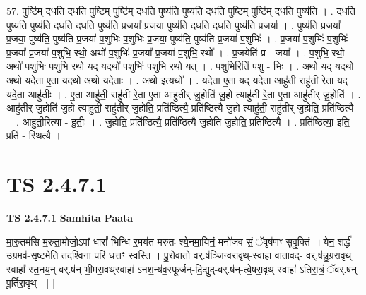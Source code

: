 \documentclass[17pt]{extarticle}
\begin{document}
57. पुष्टि॑म् दधति दधति॒ पुष्टि॒म् पुष्टि॑म् दधति॒ पुष्य॑ति॒ पुष्य॑ति दधति॒ पुष्टि॒म् पुष्टि॑म् दधति॒ पुष्य॑ति । . द॒ध॒ति॒ पुष्य॑ति॒ पुष्य॑ति दधति दधति॒ पुष्य॑ति प्र॒जया᳚ प्र॒जया॒ पुष्य॑ति दधति दधति॒ पुष्य॑ति प्र॒जया᳚ । . पुष्य॑ति प्र॒जया᳚ प्र॒जया॒ पुष्य॑ति॒ पुष्य॑ति प्र॒जया॑ प॒शुभिः॑ प॒शुभिः॑ प्र॒जया॒ पुष्य॑ति॒ पुष्य॑ति प्र॒जया॑ प॒शुभिः॑ । . प्र॒जया॑ प॒शुभिः॑ प॒शुभिः॑ प्र॒जया᳚ प्र॒जया॑ प॒शुभि॒ रथो॒ अथो॑ प॒शुभिः॑ प्र॒जया᳚ प्र॒जया॑ प॒शुभि॒ रथो᳚ । . प्र॒जयेति॑ प्र - जया᳚ । . प॒शुभि॒ रथो॒ अथो॑ प॒शुभिः॑ प॒शुभि॒ रथो॒ यद् यदथो॑ प॒शुभिः॑ प॒शुभि॒ रथो॒ यत् । . प॒शुभि॒रिति॑ प॒शु - भिः॒ । . अथो॒ यद् यदथो॒ अथो॒ यदे॒ता ए॒ता यदथो॒ अथो॒ यदे॒ताः । . अथो॒ इत्यथो᳚ । . यदे॒ता ए॒ता यद् यदे॒ता आहु॑ती॒ राहु॑ती रे॒ता यद् यदे॒ता आहु॑तीः । . ए॒ता आहु॑ती॒ राहु॑ती रे॒ता ए॒ता आहु॑तीर् जु॒होति॑ जु॒हो त्याहु॑ती रे॒ता ए॒ता आहु॑तीर् जु॒होति॑ । . आहु॑तीर् जु॒होति॑ जु॒हो त्याहु॑ती॒ राहु॑तीर् जु॒होति॒ प्रति॑ष्ठित्यै॒ प्रति॑ष्ठित्यै जु॒हो त्याहु॑ती॒ राहु॑तीर् जु॒होति॒ प्रति॑ष्ठित्यै । . आहु॑ती॒रित्या - हु॒तीः॒ । . जु॒होति॒ प्रति॑ष्ठित्यै॒ प्रति॑ष्ठित्यै जु॒होति॑ जु॒होति॒ प्रति॑ष्ठित्यै । . प्रति॑ष्ठित्या॒ इति॒ प्रति॑ - स्थि॒त्यै॒ । \newline
\pagebreak
{}
\section*{ TS 2.4.7.1 }

\textbf{TS 2.4.7.1 } \newline
\textbf{Samhita Paata} \newline

मा॒रु॒तम॑सि म॒रुता॒मोजो॒ऽपां धारां᳚ भिन्धि र॒मय॑त मरुतः श्ये॒नमा॒यिनं॒ मनो॑जव सं॒ ॅवृष॑णꣳ सुवृ॒क्तिं ॥ येन॒ शर्द्ध॑ उ॒ग्रमव॑-सृष्ट॒मेति॒ तद॑श्विना॒ परि॑ धत्तꣳ स्व॒स्ति । पु॒रो॒वा॒तो वर्.ष॑ञ्जि॒न्वरा॒वृथ्-स्वाहा॑ वा॒तावद्- वर्.ष॑न्नु॒ग्ररा॒वृथ् स्वाहा᳚ स्त॒नय॒न् वर्.ष॑न् भी॒मरा॒वथ्‌स्वाहा॑ ऽनश॒न्य॑व॒स्फूर्ज॑न्-दि॒द्युद्-वर्.ष॑न्-त्वे॒षरा॒वृथ् स्वाहा॑ ऽतिरा॒त्रं॒ ॅवर्.ष॑न् पू॒र्तिरा॒वृथ् - [  ] \newline
\end{document}
